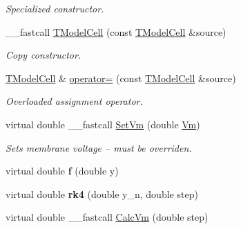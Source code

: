 \begin{DoxyCompactItemize}
\begin{DoxyCompactList}\small\item\em Specialized constructor. \end{DoxyCompactList}\item 
\hypertarget{class_t_model_cell_a6f5963a730ecb73442ef7c540eb07d58}{\+\_\+\+\_\+fastcall \hyperlink{class_t_model_cell_a6f5963a730ecb73442ef7c540eb07d58}{T\+Model\+Cell} (const \hyperlink{class_t_model_cell}{T\+Model\+Cell} \&source)}\label{class_t_model_cell_a6f5963a730ecb73442ef7c540eb07d58}

\begin{DoxyCompactList}\small\item\em Copy constructor. \end{DoxyCompactList}\item 
\hypertarget{class_t_model_cell_aec615232e0991a4b72930f68a0f0e831}{\hyperlink{class_t_model_cell}{T\+Model\+Cell} \& \hyperlink{class_t_model_cell_aec615232e0991a4b72930f68a0f0e831}{operator=} (const \hyperlink{class_t_model_cell}{T\+Model\+Cell} \&source)}\label{class_t_model_cell_aec615232e0991a4b72930f68a0f0e831}

\begin{DoxyCompactList}\small\item\em Overloaded assignment operator. \end{DoxyCompactList}\item 
\hypertarget{class_t_model_cell_a0e461d64396633fa3c5b898e4ea556fd}{virtual double \+\_\+\+\_\+fastcall \hyperlink{class_t_model_cell_a0e461d64396633fa3c5b898e4ea556fd}{Set\+Vm} (double \hyperlink{class_t_cell_afd81f2fd923ffbfa5ea7eda2c50693d1}{Vm})}\label{class_t_model_cell_a0e461d64396633fa3c5b898e4ea556fd}

\begin{DoxyCompactList}\small\item\em Sets membrane voltage -- must be overriden. \end{DoxyCompactList}\item 
\hypertarget{class_t_model_cell_ac87005aa33928e1206b60902e61531f7}{virtual double {\bfseries f} (double y)}\label{class_t_model_cell_ac87005aa33928e1206b60902e61531f7}

\item 
\hypertarget{class_t_model_cell_ab5bb6207de8a3ed08b7596407b34e36e}{virtual double {\bfseries rk4} (double y\+\_\+n, double step)}\label{class_t_model_cell_ab5bb6207de8a3ed08b7596407b34e36e}

\item 
\hypertarget{class_t_model_cell_af209cc096fc2b2da71d28e8a78ad0db2}{virtual double \+\_\+\+\_\+fastcall \hyperlink{class_t_model_cell_af209cc096fc2b2da71d28e8a78ad0db2}{Calc\+Vm} (double step)}\label{class_t_model_cell_af209cc096fc2b2da71d28e8a78ad0db2}


\end{DoxyCompactItemize}

